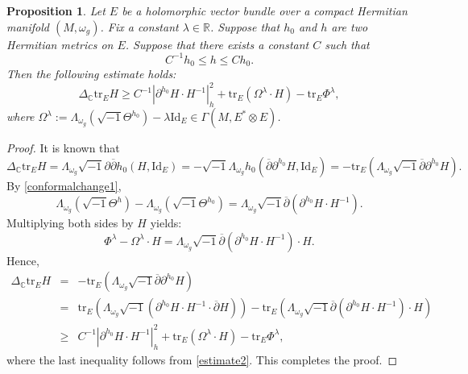 \documentclass[12pt, reqno]{amsart}
\newcommand\bp{{\bar\partial}}
\theoremstyle{plain}
\newtheorem{prop}[thm]{Proposition}
\theoremstyle{definition}
\newcommand{\bproposition}{\begin{prop}}
\newcommand{\eproposition}{\end{prop}}
\newcommand{\bproof}{\begin{proof}}
\newcommand{\eproof}{\end{proof}}
\newcommand{\sq}{\sqrt{-1}}
\newcommand{\p}{\partial}
\renewcommand{\bar}{\overline}
\newcommand{\beq}{\begin{equation}}
\newcommand{\eeq}{\end{equation}}
\newcommand{\ee}{\end{eqnarray*}}
\newcommand{\be}{\begin{eqnarray*}}
\renewcommand{\bp}{\bar{\partial}}
\newcommand{\Om}{\Omega}
\newcommand{\ts}{\otimes}
\renewcommand{\>}{\rightarrow}
\newcommand{\C}{{\mathbb C}}
\newcommand{\R}{{\mathbb R}}
\renewcommand{\>}{\rightarrow}
\renewcommand{\p}{{\partial}}
\renewcommand{\bp}{{\bar{\partial}}}
\newcommand{\om}{\omega}
\renewcommand{\bar}{\overline}
\newcommand{\smo}{\sqrt{-1}}
\newcommand{\tr}{\mathrm{tr}}
\numberwithin{equation}{section} %
\begin{document}
\bproposition\label{trEH}  Let $E$ be a holomorphic vector bundle over  a compact Hermitian manifold $(M,\omega_g)$. Fix a constant $\lambda\in \R$. Suppose that $h_0$ and $h$ are two Hermitian metrics on $E$.
Suppose that there exists a constant $C$ such that
\beq C^{-1}h_0\leq h\leq Ch_0. \eeq
Then the following estimate holds:
\beq \Delta_{\C}\mathrm{tr}_E H  \geq  C^{-1}|\p^{h_0}H \cdot H^{-1}|^2_h +\tr_E(\Om^{\lambda}\cdot H) -\mathrm{tr}_E\Phi^{\lambda},\eeq
where  $\Omega^\lambda:= \Lambda_{\omega_g}\left(\sq \Theta^{h_0}\right) - \lambda\mathrm{Id}_E \in \Gamma(M,E^*\ts  E)$.
\eproposition
\bproof  It is known that
\beq \Delta_\C \mathrm{tr}_E H=\Lambda_{\omega_g} \sq \p\bp h_0(H, \mathrm{Id}_E)=-\sq \Lambda_{\omega_g} h_0(\bp \p^{h_0} H, \mathrm{Id}_E)=-\tr_E(\Lambda_{\omega_g}\smo\bar\p\p^{h_0} H). \eeq
 By \eqref{conformalchange1},
\beq \Lambda_{\omega_g} \left(\smo \Theta^h\right) -\Lambda_{\omega_g} \left(\smo \Theta^{h_0}\right) = \Lambda_{\omega_g}\smo \bp\left(\p^{h_0}H \cdot H^{-1}\right).\label{curvaturedifference0} \eeq
Multiplying both sides by $H$ yields:
\beq \Phi^\lambda-\Om^{\lambda}\cdot H=\Lambda_{\om_g}\smo \bp(\p^{h_0}H \cdot H^{-1}) \cdot H. \eeq
Hence,
\be \Delta_{\C}\mathrm{tr}_E H & =& -\tr_E(\Lambda_{\omega_g}\smo\bar\p\p^{h_0} H) \\ &=& \mathrm{tr}_E\left(\Lambda_{\omega_g}\smo(\p^{h_0}H \cdot H^{-1} \cdot \bar\p H)\right) - \mathrm{tr}_E(\Lambda_{\omega_g}\smo\bp (\p^{h_0}H \cdot H^{-1}) \cdot H )  \\
& \geq &C^{-1}|\p^{h_0}H \cdot H^{-1}|^2_h+\tr_E(\Om^{\lambda}\cdot H) -\mathrm{tr}_E\Phi^\lambda , \ee
where the last inequality follows from \eqref{estimate2}.
This completes the proof.
\eproof
\end{document}
